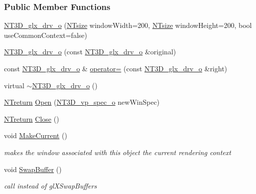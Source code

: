 \subsubsection*{Public Member Functions}
\begin{DoxyCompactItemize}
\item 
\hyperlink{class_n_t3_d__glx__drv__o_a90e777f965d159d2629b535e65ca2a00}{NT3D\_\-glx\_\-drv\_\-o} (\hyperlink{nt__types_8h_a06c124f2e4469769b58230253ce0560b}{NTsize} windowWidth=200, \hyperlink{nt__types_8h_a06c124f2e4469769b58230253ce0560b}{NTsize} windowHeight=200, bool useCommonContext=false)
\item 
\hyperlink{class_n_t3_d__glx__drv__o_afc27ef8361319bb1e2d623abba904e59}{NT3D\_\-glx\_\-drv\_\-o} (const \hyperlink{class_n_t3_d__glx__drv__o}{NT3D\_\-glx\_\-drv\_\-o} \&original)
\item 
const \hyperlink{class_n_t3_d__glx__drv__o}{NT3D\_\-glx\_\-drv\_\-o} \& \hyperlink{class_n_t3_d__glx__drv__o_a53e11a33c02df921481a84d398283dfb}{operator=} (const \hyperlink{class_n_t3_d__glx__drv__o}{NT3D\_\-glx\_\-drv\_\-o} \&right)
\item 
virtual \hyperlink{class_n_t3_d__glx__drv__o_a43c4d578de808f9bcffc03e6f72c73f4}{$\sim$NT3D\_\-glx\_\-drv\_\-o} ()
\item 
\hyperlink{nt__types_8h_ab9564ee8f091e809d21b8451c6683c53}{NTreturn} \hyperlink{class_n_t3_d__glx__drv__o_a70d67b7924d7c1e2af16105c4c5ff5b2}{Open} (\hyperlink{class_n_t3_d__vp__spec__o}{NT3D\_\-vp\_\-spec\_\-o} newWinSpec)
\item 
\hyperlink{nt__types_8h_ab9564ee8f091e809d21b8451c6683c53}{NTreturn} \hyperlink{class_n_t3_d__glx__drv__o_a228daddc76b95b376922140edf212e56}{Close} ()
\item 
void \hyperlink{class_n_t3_d__glx__drv__o_a87a4df668792c821049de5cb08e6a506}{MakeCurrent} ()
\begin{DoxyCompactList}\small\item\em makes the window associated with this object the current rendering context \item\end{DoxyCompactList}\item 
void \hyperlink{class_n_t3_d__glx__drv__o_a8ebd5989b6e692f218feab78a40f1bbe}{SwapBuffer} ()
\begin{DoxyCompactList}\small\item\em call instead of glXSwapBuffers \item\end{DoxyCompactList}\item 

\end{DoxyCompactItemize}
